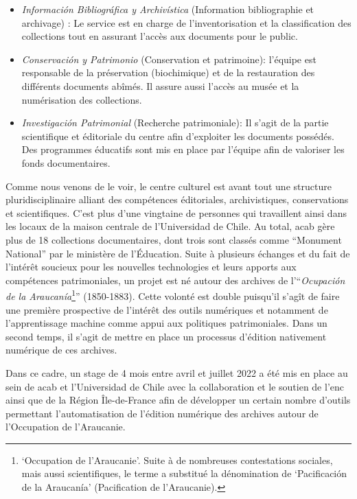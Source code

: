 \begin{itemize}
\item \textit{Información Bibliográfica y Archivística} (Information bibliographie et archivage) : Le service est en charge de l'inventorisation et la classification des collections tout en assurant l'accès aux documents pour le public.

\item \textit{Conservación y Patrimonio} (Conservation et patrimoine): l'équipe est responsable de la préservation (biochimique) et de la restauration des différents documents abîmés. Il assure aussi l'accès au musée et la numérisation des collections.

\item \textit{Investigación Patrimonial} (Recherche patrimoniale): Il s'agit de la partie scientifique et éditoriale du centre afin d'exploiter les documents possédés. Des programmes éducatifs sont mis en place par l'équipe afin de valoriser les fonds documentaires.
\end{itemize}
Comme nous venons de le voir, le centre culturel est avant tout une structure pluridisciplinaire alliant des compétences éditoriales, archivistiques, conservations et scientifiques. C'est plus d'une vingtaine de personnes qui travaillent ainsi dans les locaux de la maison centrale de l'Universidad de Chile. Au total, \gls{acab} gère plus de 18 collections documentaires, dont trois sont classés comme \enquote{Monument National} par le ministère de l'Éducation. \newpar
Suite à plusieurs échanges et du fait de l'intérêt soucieux pour les nouvelles technologies et leurs apports aux compétences patrimoniales, un projet est né autour des archives de l'\enquote{\textit{Ocupación de la Araucanía}\footnote{\enquote{Occupation de l'Araucanie}. Suite à de nombreuses contestations sociales, mais aussi scientifiques, le terme a substitué la dénomination de \enquote{Pacificación de la Araucanía} (Pacification de l'Araucanie).}} (1850-1883). Cette volonté est double puisqu'il s'agît de faire une première prospective de l'intérêt des outils numériques et notamment de l'apprentissage machine comme appui aux politiques patrimoniales. Dans un second temps, il s'agit de mettre en place un processus d'édition nativement numérique de ces archives.\par
Dans ce cadre, un stage de 4 mois entre avril et juillet 2022 a été mis en place au sein de \gls{acab} et l'Universidad de Chile avec la collaboration et le soutien de l'\gls{enc} ainsi que de la Région Île-de-France afin de développer un certain nombre d'outils permettant l'automatisation de l'édition numérique des archives autour de l'Occupation de l'Araucanie.



